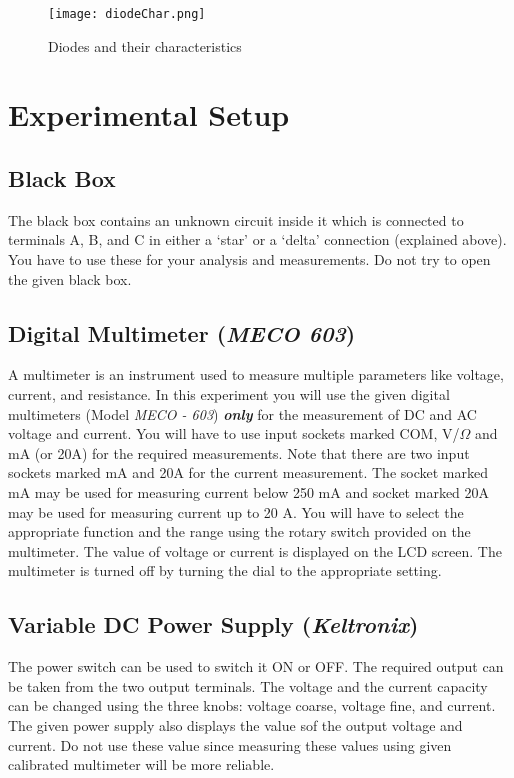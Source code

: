 \begin{figure}[!htb]
\centering
\texttt{[image: diodeChar.png]}
\caption{Diodes and their characteristics}
\label{diodeChar}
\end{figure}



\section*{Experimental Setup}


\subsection*{Black Box}
The black box contains an unknown circuit inside it which is connected to terminals A, B, and C in either a `star' or a `delta' connection (explained above). You have to use these for your analysis and measurements. Do not try to open the given black box.

\subsection*{Digital Multimeter (\textit{MECO 603})}

A multimeter is an instrument used to measure multiple parameters like voltage, current, and resistance. In this experiment you will use the given digital multimeters (Model \textit{MECO - 603}) \textbf{\textit{only}} for the measurement of DC and AC voltage and current. You will have to use input sockets marked COM, V/$\Omega$ and mA (or 20A) for the required measurements. Note that there are two input sockets marked mA and 20A for the current measurement. The socket marked mA may be used for measuring current below 250 mA and socket marked 20A may be used for measuring current up to 20 A. You will have to select the appropriate function and the range using the rotary switch provided on the multimeter. The value of voltage or current is displayed on the LCD screen. The multimeter is turned off by turning the dial to the appropriate setting.

\subsection*{Variable DC Power Supply (\textit{Keltronix})}

The power switch can be used to switch it ON or OFF. The required output can be taken from the two output terminals. The voltage and the current capacity can be changed using the three knobs: voltage coarse, voltage fine, and current. The given power supply also displays the value sof the output voltage and current. Do not use these value since measuring these values using given calibrated multimeter will be more reliable. 

